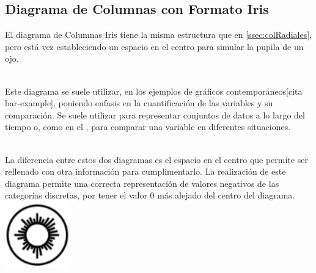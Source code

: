 \documentclass{article}\usepackage[]{graphicx}\usepackage[]{color}
\begin{document}
\subsection{Diagrama de Columnas con Formato Iris}\label{ssec:colRadialesIris}
El diagrama de Columnas Iris tiene la misma estructura que en \ref{ssec:colRadiales}, pero est\'a vez estableciendo un espacio en el centro para simular la pupila de un ojo.~\\~\par
Este diagrama se suele utilizar, en los ejemplos de gr\'aficos contempor\'aneos[cita bar-example], poniendo enfasis en la cuantificaci\'on de las variables y su comparaci\'on. Se suele utilizar para representar conjuntos de datos a lo largo del tiempo o, como en el , para comparar una variable en diferentes situaciones.~\\~\par
La diferencia entre estos dos diagramas es el espacio en el centro que permite ser rellenado con otra informaci\'on para cumplimentarlo. La realizaci\'on de este diagrama permite una correcta representaci\'on de valores negativos de las categor\'ias discretas, por tener el valor 0 m\'as alejado del centro del diagrama.
~\\
\vbox{
    \centering
    \includegraphics[width=0.21\textwidth]{imag/columnas_sep}
}
\end{document}
